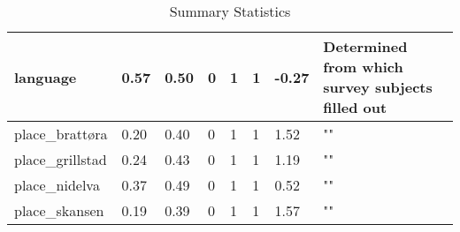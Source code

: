 \documentclass{article}
\begin{document}
\begin{center}
\begin{table}[!ht]
\begin{tabular}{|l|l|l|l|l|l|l|l|}
        language & 0.57 & 0.50 & 0 & 1 & 1 & -0.27 & Determined from which survey subjects filled out \\ \hline
        place\_brattøra & 0.20 & 0.40 & 0 & 1 & 1 & 1.52 & "" \\ \hline
        place\_grillstad & 0.24 & 0.43 & 0 & 1 & 1 & 1.19 & "" \\ \hline
        place\_nidelva & 0.37 & 0.49 & 0 & 1 & 1 & 0.52 & "" \\ \hline
        place\_skansen & 0.19 & 0.39 & 0 & 1 & 1 & 1.57 & "" \\ \hline
    \end{tabular}
    \caption{Summary Statistics}
\label{table:summary_stats}
\end{table}
\end{center}
\end{document}
